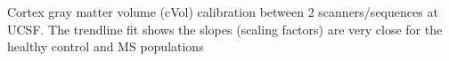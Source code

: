 \label{fig:hcms_GMV} Cortex gray matter volume (cVol) calibration between 2 scanners/sequences at UCSF. The trendline fit shows the slopes (scaling factors) are very close for the healthy control and MS populations